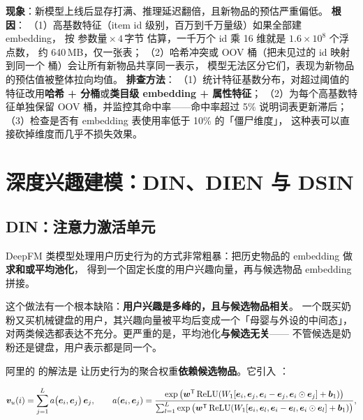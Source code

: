 \begin{pitfall}
\textbf{现象}：新模型上线后显存打满、推理延迟翻倍，且新物品的预估严重偏低。
\textbf{根因}：
（1）高基数特征（item id 级别，百万到千万量级）如果全部建 embedding，
按 $\text{参数量} \times 4\,\text{字节}$ 估算，一千万个 id 乘 16 维就是 $1.6 \times 10^{8}$ 个浮点数，
约 640\,MB，仅一张表；
（2）哈希冲突或 OOV 桶（把未见过的 id 映射到同一个  桶）会让所有新物品共享同一表示，
模型无法区分它们，表现为新物品的预估值被整体拉向均值。
\textbf{排查方法}：
（1）统计特征基数分布，对超过阈值的特征改用\textbf{哈希 + 分桶}或\textbf{类目级 embedding + 属性特征}；
（2）为每个高基数特征单独保留 OOV 桶，并监控其命中率——命中率超过 5\% 说明词表更新滞后；
（3）检查是否有 embedding 表使用率低于 10\% 的「僵尸维度」，
这种表可以直接砍掉维度而几乎不损失效果。
\end{pitfall}

\section{深度兴趣建模：DIN、DIEN 与 DSIN}

\subsection{DIN：注意力激活单元}

DeepFM 类模型处理用户历史行为的方式非常粗暴：把历史物品的 embedding 做\textbf{求和或平均池化}，
得到一个固定长度的用户兴趣向量，再与候选物品 embedding 拼接。

这个做法有一个根本缺陷：\textbf{用户兴趣是多峰的，且与候选物品相关}。
一个既买奶粉又买机械键盘的用户，其兴趣向量被平均后变成一个「母婴与外设的中间态」，
对两类候选都表达不充分。更严重的是，平均池化\textbf{与候选无关}——
不管候选是奶粉还是键盘，用户表示都是同一个。

阿里的  \cite{zhou2018din} 的解法是
让历史行为的聚合权重\textbf{依赖候选物品}。它引入 ：

\begin{equation}
\bm{v}_u(i) = \sum_{j=1}^{L} a\big(\bm{e}_i, \bm{e}_j\big) \, \bm{e}_j ,
\qquad
a(\bm{e}_i, \bm{e}_j) = \frac{\exp\big( \bm{w}^{\mathsf{T}} \operatorname{ReLU}( W_1 [\bm{e}_i, \bm{e}_j, \bm{e}_i - \bm{e}_j, \bm{e}_i \odot \bm{e}_j] + \bm{b}_1 ) \big)}
{\sum_{l=1}^{L} \exp\big( \bm{w}^{\mathsf{T}} \operatorname{ReLU}( W_1 [\bm{e}_i, \bm{e}_l, \bm{e}_i - \bm{e}_l, \bm{e}_i \odot \bm{e}_l] + \bm{b}_1 ) \big)},
\label{eq:din}
\end{equation}

